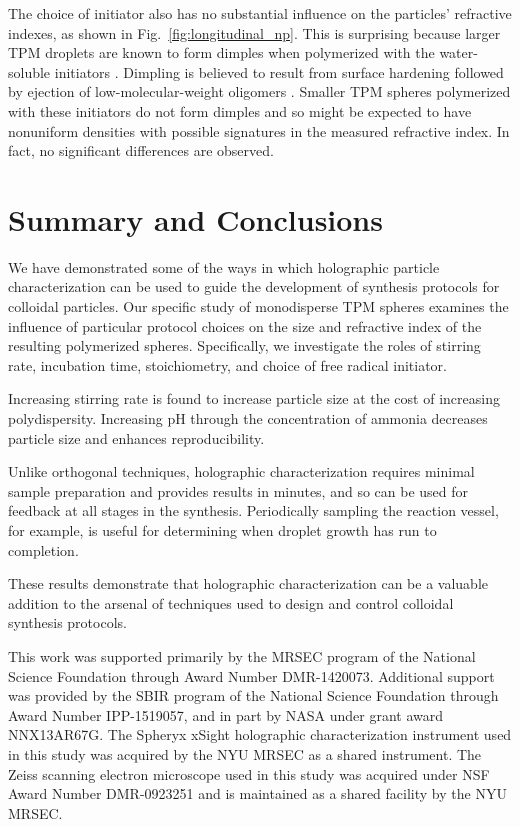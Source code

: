 \documentclass[journal=langd5,manuscript=article]{achemso}
\begin{document}
The choice of initiator also has no substantial
influence on the particles' refractive indexes,
as shown in Fig.~\ref{fig:longitudinal_np}.
This is surprising because
larger TPM droplets are known to form dimples when polymerized
with the water-soluble initiators \cite{sacanna11}.
Dimpling is believed to result from
surface hardening followed by
ejection of low-molecular-weight oligomers \cite{sacanna11}.
Smaller TPM spheres polymerized with these
initiators do not form dimples and so might 
be expected to have nonuniform densities
with possible signatures in the measured refractive
index.  In fact, no significant differences are observed.

\section{Summary and Conclusions}
\label{sec:discussion}

We have demonstrated some of the ways in which 
holographic particle characterization
can be used to guide the development of synthesis
protocols for colloidal particles.
Our specific study of monodisperse TPM spheres
examines the influence of particular protocol
choices on the size and refractive index of 
the resulting polymerized spheres. Specifically,
we investigate the roles of stirring rate, 
incubation time, stoichiometry, and choice of
free radical initiator.

Increasing stirring rate is found to increase particle
size at the cost of increasing polydispersity.
Increasing pH through the concentration of ammonia 
decreases particle size and enhances 
reproducibility.

Unlike orthogonal techniques, holographic characterization requires minimal
sample preparation and provides results in minutes,
and so can be used for feedback at all stages in
the synthesis.
Periodically sampling the reaction vessel, for example, 
is useful for determining when droplet growth has
run to completion.

These results demonstrate that holographic characterization can be a valuable
addition to the arsenal of techniques used to design and control colloidal
synthesis protocols.

\begin{acknowledgement}
This work was supported primarily by the MRSEC program of
the National Science Foundation through Award Number DMR-1420073.
Additional support was provided by the SBIR program of the
National Science Foundation through Award Number IPP-1519057, and in part by
NASA under grant award NNX13AR67G.
The Spheryx xSight holographic characterization instrument
used in this study was acquired by the NYU MRSEC as a shared
instrument.
The Zeiss scanning electron microscope used in this study
was acquired under
NSF Award Number DMR-0923251 and is maintained as a shared
facility by the NYU MRSEC.

\end{acknowledgement}
\end{document}
